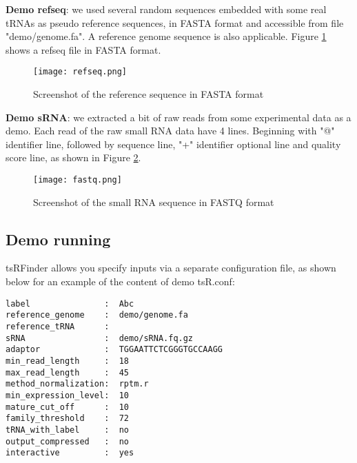 \documentclass[11pt, a4paper]{article}
\begin{document}
\textbf{Demo refseq}: we used several random sequences embedded with some real tRNAs as pseudo reference sequences, in FASTA format and accessible from file "demo/genome.fa". A reference genome sequence is also applicable. Figure \ref{refseq} shows a refseq file in FASTA format.

\begin{figure}[htbp]
\begin{center}
\texttt{[image: refseq.png]}
\caption{Screenshot of the reference sequence in FASTA format}
\label{refseq}
\end{center}
\end{figure}

\textbf{Demo sRNA}: we extracted a bit of raw reads from some experimental data as a demo. Each read of the raw small RNA data have 4 lines. Beginning with "@" identifier line, followed by sequence line, "+" identifier optional line and quality score line, as shown in Figure \ref{fastq}.

\begin{figure}[htbp]
\begin{center}
\texttt{[image: fastq.png]}
\caption{Screenshot of the small RNA sequence in FASTQ format}
\label{fastq}
\end{center}
\end{figure}

\subsection{Demo running}

tsRFinder allows you specify inputs via a separate configuration file, as shown below for an example of the content of demo tsR.conf:

{\footnotesize \begin{tcolorbox}[colback=blue!5!white,colframe=pink!75!black,title=Demo configuration file for tsRFinder: demo/tsR.conf]
\begin{verbatim}
label               :  Abc
reference_genome    :  demo/genome.fa
reference_tRNA      :
sRNA                :  demo/sRNA.fq.gz
adaptor             :  TGGAATTCTCGGGTGCCAAGG
min_read_length     :  18
max_read_length     :  45
method_normalization:  rptm.r
min_expression_level:  10
mature_cut_off      :  10
family_threshold    :  72
tRNA_with_label     :  no
output_compressed   :  no
interactive         :  yes
\end{verbatim}
\end{tcolorbox}}
\end{document}
